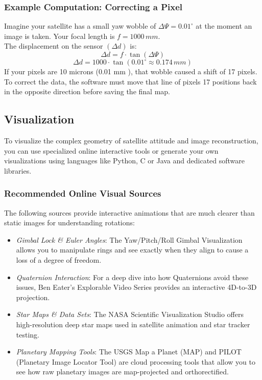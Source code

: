 \documentclass[a4paper,10pt]{article}
\begin{document}
\subsubsection{Example Computation: Correcting a Pixel}
Imagine your satellite has a small yaw wobble of \( \Delta \varPsi = 0.01^{\circ} \) at the moment an image is taken. Your focal length is \( f = 1000\,mm \).\\
The displacement on the sensor \( ( \Delta d ) \) is:
\[ \Delta d = f \cdot \tan(\Delta \varPsi) \]
\[ \Delta d = 1000 \cdot \tan(0.01^{\circ} \approx 0.174\,mm) \]
If your pixels are 10 microns (0.01 mm ), that wobble caused a shift of 17 pixels. To correct the data, the software must move that line of pixels 17 positions back in the opposite direction before saving the final map.
\subsection{Visualization}
To visualize the complex geometry of satellite attitude and image reconstruction, you can use specialized online interactive tools or generate your own visualizations using languages like Python, C or Java and dedicated software libraries.
\subsubsection{Recommended Online Visual Sources}
The following sources provide interactive animations that are much clearer than static images for understanding rotations:
\begin{itemize}
\item \emph{Gimbal Lock \& Euler Angles}: The Yaw/Pitch/Roll Gimbal Visualization allows you to manipulate rings and see exactly when they align to cause a loss of a degree of freedom.
\item \emph{Quaternion Interaction}: For a deep dive into how Quaternions avoid these issues, Ben Eater’s Explorable Video Series provides an interactive 4D-to-3D projection.
\item \emph{Star Maps \& Data Sets}: The NASA Scientific Visualization Studio offers high-resolution deep star maps used in satellite animation and star tracker testing.
\item \emph{Planetary Mapping Tools}: The USGS Map a Planet (MAP) and PILOT (Planetary Image Locator Tool) are cloud processing tools that allow you to see how raw planetary images are map-projected and orthorectified.
\end{itemize}
\end{document}
